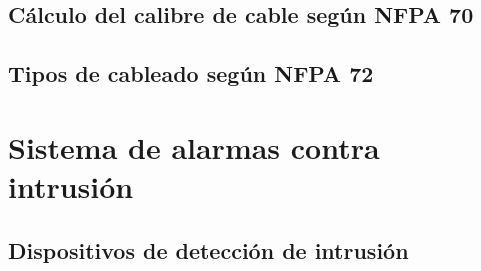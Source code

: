 \subsection{Cálculo del calibre de cable según NFPA 70}





\subsection{Tipos de cableado según NFPA 72}

%
%
%
%
%
%



\newpage

\section{Sistema de alarmas contra intrusión}


\subsection{Dispositivos de detección de intrusión}

